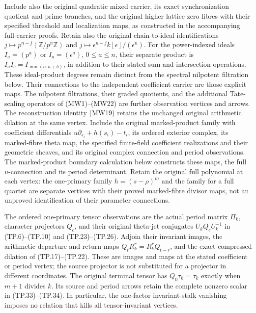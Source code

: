 Include also the original quadratic mixed carrier, its exact
synchronization quotient and prime branches, and the original
higher lattice zero fibres with their specified threshold and
localization maps, as constructed in the accompanying full-carrier
proofs. Retain also the original chain-to-ideal identifications
$j\mapsto p^{n-j}(\mathbb Z/p^n\mathbb Z)$ and
$j\mapsto\epsilon^{n-j}k[\epsilon]/(\epsilon^n)$.
For the power-indexed ideals $I_a=(p^a)$ or $I_a=(\epsilon^a)$,
$0\leq a\leq n$, their separate product is
$I_aI_b=I_{\min(n,a+b)}$, in addition to their stated sum and
intersection operations. These ideal-product degrees remain
distinct from the spectral nilpotent filtration below.
Their connections to the independent coefficient carrier
are those explicit maps. The nilpotent filtrations, their graded
quotients, and the additional Tate-scaling operators of
(MW1)--(MW22) are further observation vertices and arrows.
The reconstruction identity (MW19) retains the unchanged original
arithmetic dilation at the same vertex.
Include the original marked-product family with coefficient
differentials $u\partial_{s_i}+h(s_i)-t_i$, its ordered exterior
complex, its marked-fibre theta map, the specified finite-field
coefficient realizations and their geometric sheaves, and its
original complex connection and period observations. The
marked-product boundary calculation below constructs these maps,
the full $u$-connection and its period determinant. Retain the
original full polynomial at each vertex: the one-primary family
$h=(s-\rho)^m$ and the family for a full quartet are separate
vertices with their proved marked-fibre divisor maps, not an
unproved identification of their parameter connections.

The ordered one-primary tensor observations are the actual
period matrix $\Pi_k$, character projectors $Q_c$, and their
original theta-jet conjugates $U_kQ_cU_k^{-1}$ in
(TP.6)--(TP.10) and (TP.23)--(TP.26). Adjoin their invariant
images, the arithmetic departure and return maps
$Q_tR_k^r=R_k^rQ_{t-r}$, and the exact compressed dilation
of (TP.17)--(TP.22). These are images and maps at the stated
coefficient or period vertex; the source projector is not
substituted for a projector in different coordinates.
The original terminal tensor has $Q_0\tau_k=\tau_k$ exactly
when $m+1$ divides $k$. Its source and period arrows retain
the complete nonzero scalar in (TP.33)--(TP.34). In particular,
the one-factor invariant-stalk vanishing imposes no relation
that kills all tensor-invariant vertices.

